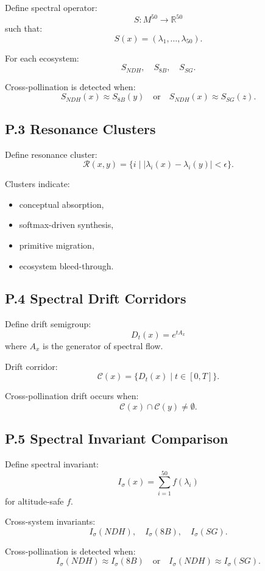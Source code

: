 Define spectral operator:
\[
S : M^{50} \to \mathbb{R}^{50}
\]
such that:
\[
S(x) = (\lambda_1, \dots, \lambda_{50}).
\]

For each ecosystem:
\[
S_{NDH},\quad S_{8B},\quad S_{SG}.
\]

Cross-pollination is detected when:
\[
S_{NDH}(x) \approx S_{8B}(y)
\quad\text{or}\quad
S_{NDH}(x) \approx S_{SG}(z).
\]

\subsection*{P.3 Resonance Clusters}

Define resonance cluster:
\[
\mathcal{R}(x,y)
=
\{ i \mid |\lambda_i(x) - \lambda_i(y)| < \epsilon \}.
\]

Clusters indicate:
\begin{itemize}
    \item conceptual absorption,
    \item softmax-driven synthesis,
    \item primitive migration,
    \item ecosystem bleed-through.
\end{itemize}

\subsection*{P.4 Spectral Drift Corridors}

Define drift semigroup:
\[
D_t(x) = e^{tA_x}
\]
where $A_x$ is the generator of spectral flow.

Drift corridor:
\[
\mathcal{C}(x) = \{ D_t(x) \mid t \in [0,T] \}.
\]

Cross-pollination drift occurs when:
\[
\mathcal{C}(x) \cap \mathcal{C}(y) \neq \emptyset.
\]

\subsection*{P.5 Spectral Invariant Comparison}

Define spectral invariant:
\[
I_{\sigma}(x) = \sum_{i=1}^{50} f(\lambda_i)
\]
for altitude-safe $f$.

Cross-system invariants:
\[
I_{\sigma}(NDH),\quad
I_{\sigma}(8B),\quad
I_{\sigma}(SG).
\]

Cross-pollination is detected when:
\[
I_{\sigma}(NDH) \approx I_{\sigma}(8B)
\quad\text{or}\quad
I_{\sigma}(NDH) \approx I_{\sigma}(SG).
\]

